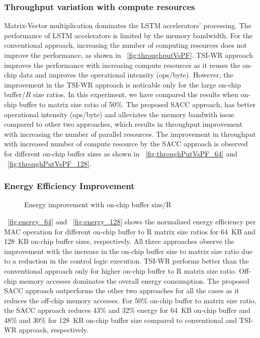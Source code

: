 {{{\subsubsection{Throughput variation with compute resources}
Matrix-Vector multiplication dominates the LSTM accelerators' processing. The performance of LSTM accelerators is limited by the memory bandwidth. For the conventional approach, increasing the number of computing resources does not improve the performance, as shown in \figurename{~\ref{fig:throughputVsPF}}. TSI-WR approach improves the performance with increasing compute resources as it reuses the on-chip data and improves the operational intensity (ops/byte). However, the improvement in the TSI-WR approach is noticable only for the large on-chip buffer/$R$ size ratios. In this experiment, we have compared the results when on-chip buffer to matrix size ratio of 50\%. The proposed SACC approach, has better operational intensity (ops/byte) and alleviates the memory bandwith issue compared to other two approaches, which results in throughput improvement with increasing the number of parallel resources. The improvement in throughput with increased number of compute resource by the SACC approach is observed for different on-chip buffer sizes as shown in \figurename{~\ref{fig:throughPutVsPF_64}} and \figurename{~\ref{fig:throughPutVsPF_128}}.
\subsubsection{Energy Efficiency Improvement}

\begin{figure}[htb!]
	\centering
	\hspace{2.0em}
	\caption{Energy improvement with on-chip buffer size/R}\label{fig:energyVsMem}
\end{figure}
\figurename{~\ref{fig:energy_64}} and \figurename{~\ref{fig:energy_128}} shows the normalized energy efficiency per MAC operation for different on-chip buffer to R matrix size ratios for 64~KB and 128~KB on-chip buffer sizes, respectively.  All three approaches observe the improvement with the increase in the on-chip buffer size to matrix size ratio due to a reduction in the control logic execution. TSI-WR performs better than the conventional approach only for higher on-chip buffer to R matrix size ratio. Off-chip memory accesses dominates the overall energy consumption. The proposed SACC approach outperforms the other two approaches for all the cases as it reduces the off-chip memory accesses. For 50\% on-chip buffer to matrix size ratio, the SACC approach reduces 43\% and 32\% energy for 64~KB on-chip buffer and 48\% and 30\% for 128~KB on-chip buffer size compared to conventional and TSI-WR approach, respectively.

}}}
